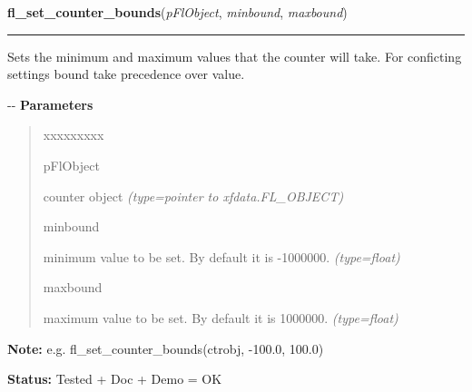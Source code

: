 \hspace{.8\funcindent}\begin{boxedminipage}{\funcwidth}

    \raggedright \textbf{fl\_set\_counter\_bounds}(\textit{pFlObject}, \textit{minbound}, \textit{maxbound})

    \vspace{-1.5ex}

    \rule{\textwidth}{0.5\fboxrule}
\setlength{\parskip}{2ex}

Sets the minimum and maximum values that the counter will take. For
conficting settings bound take precedence over value.

-{}-
\setlength{\parskip}{1ex}
      \textbf{Parameters}
      \vspace{-1ex}

      \begin{quote}
        \begin{Ventry}{xxxxxxxxx}

          \item[pFlObject]


counter object
            {\it (type=pointer to xfdata.FL\_OBJECT)}

          \item[minbound]


minimum value to be set. By default it is -1000000.
            {\it (type=float)}

          \item[maxbound]


maximum value to be set. By default it is 1000000.
            {\it (type=float)}

        \end{Ventry}

      \end{quote}

\textbf{Note:} 
e.g. fl\_set\_counter\_bounds(ctrobj, -100.0, 100.0)


\textbf{Status:} 
Tested + Doc + Demo = OK


    \end{boxedminipage}

    \label{xformslib:flcounter:fl_set_counter_step}

    \vspace{0.5ex}

